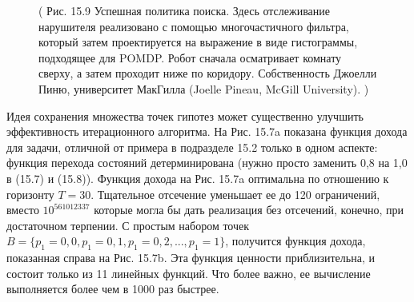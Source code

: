 \documentclass[10pt,a4paper]{article}
\begin{document}
\begin{figure}[H]
	\caption{ ( Рис. 15.9 Успешная политика поиска. Здесь отслеживание нарушителя реализовано с помощью многочастичного фильтра, который затем проектируется на выражение в виде гистограммы, подходящее для POMDP. Робот сначала осматривает комнату сверху, а затем проходит ниже по коридору. Собственность Джоелли Пиню, университет МакГилла (Joelle Pineau, McGill University). ) }
	\label{fig:159orig}
\end{figure}

Идея сохранения множества точек гипотез может существенно улучшить эффективность итерационного алгоритма. На Рис. 15.7a показана функция дохода для задачи, отличной от примера в подразделе 15.2 только в одном аспекте: функция перехода состояний детерминирована (нужно просто заменить 0,8 на 1,0 в (15.7) и (15.8)). Функция дохода на Рис. 15.7a оптимальна по отношению к горизонту $T = 30$. Тщательное отсечение уменьшает ее до 120 ограничений, вместо $10^{561012337}$ которые могла бы дать реализация без отсечений, конечно, при достаточном терпении. С простым набором точек $B = \{p_1 = 0,0, p_1 = 0,1, p_1 = 0,2,..., p_1 = 1\}$, получится функция дохода, показанная справа на Рис. 15.7b. Эта функция ценности приблизительна, и состоит только из 11 линейных функций. Что более важно, ее вычисление выполняется более чем в 1000 раз быстрее.
\end{document}
